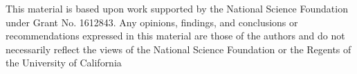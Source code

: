 %
%


This material is based upon work supported by the National Science Foundation under Grant No. 1612843. Any opinions, findings, and conclusions or recommendations expressed in this material are those of the authors and do not necessarily reflect the views of the National Science Foundation or the Regents of the University of California

